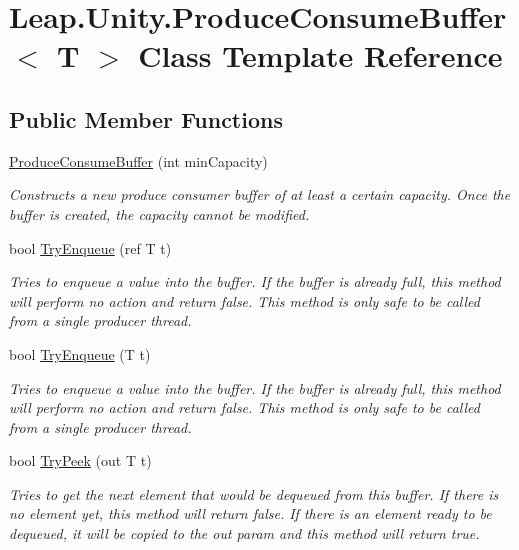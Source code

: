 \hypertarget{class_leap_1_1_unity_1_1_produce_consume_buffer}{}\section{Leap.\+Unity.\+Produce\+Consume\+Buffer$<$ T $>$ Class Template Reference}
\label{class_leap_1_1_unity_1_1_produce_consume_buffer}
\subsection*{Public Member Functions}
\begin{DoxyCompactItemize}
\item 
\mbox{\hyperlink{class_leap_1_1_unity_1_1_produce_consume_buffer_abb2dd45e9fdf9542e1392a16b5a19a9e}{Produce\+Consume\+Buffer}} (int min\+Capacity)
\begin{DoxyCompactList}\small\item\em Constructs a new produce consumer buffer of at least a certain capacity. Once the buffer is created, the capacity cannot be modified. \end{DoxyCompactList}\item 
bool \mbox{\hyperlink{class_leap_1_1_unity_1_1_produce_consume_buffer_a2c3eaa1d8aafc68cf6d8d020ae47e4de}{Try\+Enqueue}} (ref T t)
\begin{DoxyCompactList}\small\item\em Tries to enqueue a value into the buffer. If the buffer is already full, this method will perform no action and return false. This method is only safe to be called from a single producer thread. \end{DoxyCompactList}\item 
bool \mbox{\hyperlink{class_leap_1_1_unity_1_1_produce_consume_buffer_ae80a5be8a8e07eb8b922fdfca764f1da}{Try\+Enqueue}} (T t)
\begin{DoxyCompactList}\small\item\em Tries to enqueue a value into the buffer. If the buffer is already full, this method will perform no action and return false. This method is only safe to be called from a single producer thread. \end{DoxyCompactList}\item 
bool \mbox{\hyperlink{class_leap_1_1_unity_1_1_produce_consume_buffer_a4884c0e9c693c92439a2bc7fe99275e9}{Try\+Peek}} (out T t)
\begin{DoxyCompactList}\small\item\em Tries to get the next element that would be dequeued from this buffer. If there is no element yet, this method will return false. If there is an element ready to be dequeued, it will be copied to the out param and this method will return true. \end{DoxyCompactList}\item 

\end{DoxyCompactItemize}
